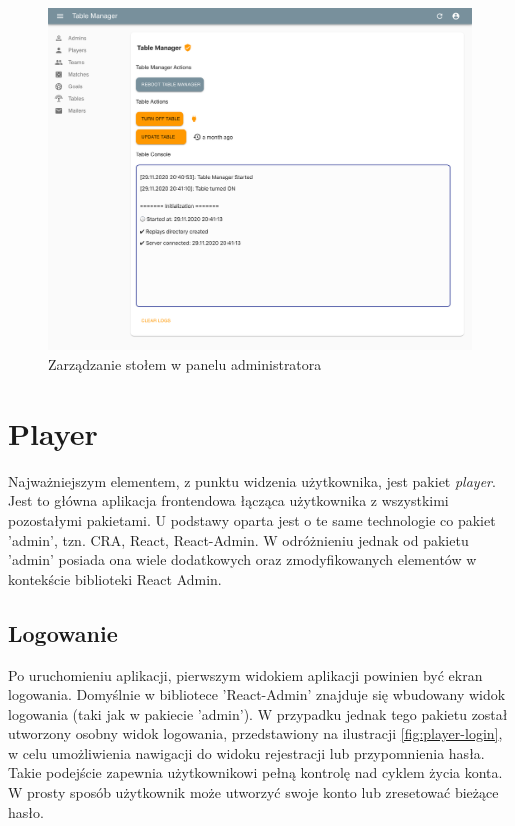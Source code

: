 \begin{figure}[h!]
  \centering
    \includegraphics[width=\textwidth]{images/admin/table-manager.png}
  \caption{Zarządzanie stołem w panelu administratora}
  \label{fig:admin-table-manager}
\end{figure}

\newpage

\section{Player}
Najważniejszym elementem, z punktu widzenia użytkownika, jest pakiet \textit{player}. Jest to główna aplikacja frontendowa łącząca użytkownika z wszystkimi pozostałymi pakietami. U podstawy oparta jest o te same technologie co pakiet 'admin', tzn. CRA, React, React-Admin. W odróżnieniu jednak od pakietu 'admin' posiada ona wiele dodatkowych oraz zmodyfikowanych elementów w kontekście biblioteki React Admin.

\subsection{Logowanie}
Po uruchomieniu aplikacji, pierwszym widokiem aplikacji powinien być ekran logowania. Domyślnie w bibliotece 'React-Admin' znajduje się wbudowany widok logowania (taki jak w pakiecie 'admin'). W przypadku jednak tego pakietu został utworzony osobny widok logowania, przedstawiony na ilustracji \ref{fig:player-login}, w celu umożliwienia nawigacji do widoku rejestracji lub przypomnienia hasła. Takie podejście zapewnia użytkownikowi pełną kontrolę nad cyklem życia konta. W prosty sposób użytkownik może utworzyć swoje konto lub zresetować bieżące hasło.

